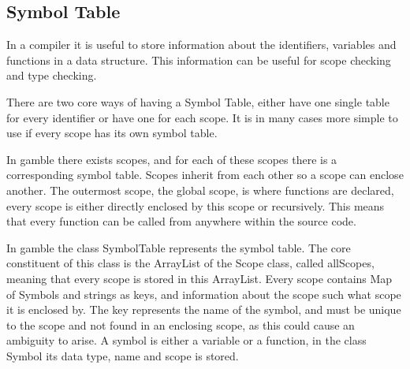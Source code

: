 \subsection*{Symbol Table}
In a compiler it is useful to store information about the identifiers, variables and functions in a data structure. 
This information can be useful for scope checking and type checking.

There are two core ways of having a Symbol Table, either have one single table for every identifier or have one for each scope.
It is in many cases more simple to use if every scope has its own symbol table. 

In \gls{gamble} there exists scopes, and for each of these scopes there is a corresponding symbol table. 
Scopes inherit from each other so a scope can enclose another. 
The outermost scope, the global scope, is where functions are declared, every scope is either directly enclosed by this scope or recursively.
This means that every function can be called from anywhere within the source code. 

In \gls{gamble} the class SymbolTable represents the symbol table.
The core constituent of this class is the ArrayList of the Scope class, called allScopes, meaning that every scope is stored in this ArrayList.
Every scope contains Map of Symbols and strings as keys, and information about the scope such what scope it is enclosed by. 
The key represents the name of the symbol, and must be unique to the scope and not found in an enclosing scope, as this could cause an ambiguity to arise. 
A symbol is either a variable or a function, in the class Symbol its data type, name and scope is stored. 

